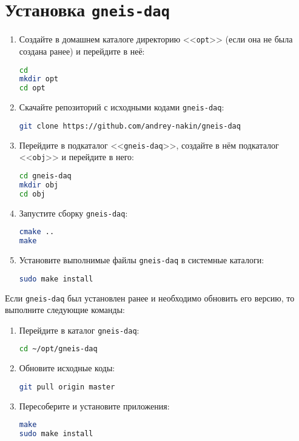 \documentclass[12pt, a4paper, oneside, onecolumn]{book}
\newcommand{\GD}{{\tt gneis-daq}}
\newcommand{\DIRECTORY}[1]{<<{\tt #1}>>}
\begin{document}
\section{Установка \GD{}}

\begin{enumerate}
\item Создайте в домашнем каталоге директорию \DIRECTORY{opt} (если она не была создана ранее) и перейдите в неё:

\begin{lstlisting}[language=bash]
cd
mkdir opt
cd opt
\end{lstlisting}

\item Скачайте репозиторий с исходными кодами \GD{}:

\begin{lstlisting}[language=bash]
git clone https://github.com/andrey-nakin/gneis-daq
\end{lstlisting}

\item Перейдите в подкаталог \DIRECTORY{gneis-daq}, создайте в нём подкаталог \DIRECTORY{obj} и перейдите в него:

\begin{lstlisting}[language=bash]
cd gneis-daq
mkdir obj
cd obj
\end{lstlisting}

\item Запустите сборку \GD{}:

\begin{lstlisting}[language=bash]
cmake ..
make
\end{lstlisting}

\item Установите выполнимые файлы \GD{} в системные каталоги{}:

\begin{lstlisting}[language=bash]
sudo make install
\end{lstlisting}

\end{enumerate}

Если \GD{} был установлен ранее и необходимо обновить его версию, то выполните следующие команды:

\begin{enumerate}
\item Перейдите в каталог \GD{}:

\begin{lstlisting}[language=bash]
cd ~/opt/gneis-daq
\end{lstlisting}

\item Обновите исходные коды:

\begin{lstlisting}[language=bash]
git pull origin master
\end{lstlisting}

\item Пересоберите и установите приложения:

\begin{lstlisting}[language=bash]
make
sudo make install
\end{lstlisting}

\end{enumerate}
\end{document}
